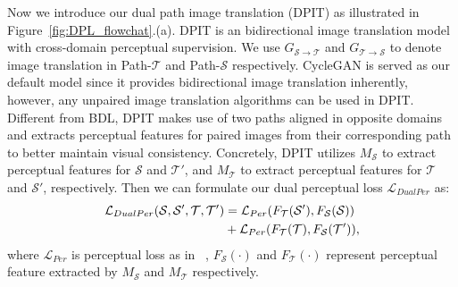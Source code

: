 \documentclass[10pt,twocolumn,letterpaper]{article}
\begin{document}
Now we introduce our dual path image translation (DPIT) as illustrated in Figure~\ref{fig:DPL_flowchat}.(a). DPIT is an bidirectional image translation model with cross-domain perceptual supervision. We use ${G_{\mathcal{S}\rightarrow\mathcal{T}}}$ and ${G_{\mathcal{T}\rightarrow\mathcal{S}}}$ to denote image translation in Path-$\mathcal{T}$ and Path-$\mathcal{S}$ respectively. CycleGAN is served as our default model since it provides bidirectional image translation inherently, however, any unpaired image translation algorithms can be used in DPIT. Different from BDL, DPIT makes use of two paths aligned in opposite domains and extracts perceptual features for paired images from their corresponding path to better maintain visual consistency. Concretely, DPIT utilizes $M_{\mathcal{S}}$ to extract perceptual features for $\mathcal{S}$ and $\mathcal{T}'$, and $M_{\mathcal{T}}$ to extract perceptual features for $\mathcal{T}$ and $\mathcal{S}'$, respectively. Then we can formulate our dual perceptual loss $\mathcal{L}_{DualPer}$ as:
\begin{equation}
  \label{loss:tranlation_loss}
  \begin{aligned}
 \mathcal{L}_{DualPer}(\mathcal{S}, \mathcal{S}', \mathcal{T}, \mathcal{T}')&=  \mathcal{L}_{Per}(F_{\mathcal{T}}(\mathcal{S}'), F_{\mathcal{S}}(\mathcal{S}))\\
 &+\mathcal{L}_{Per}(F_{\mathcal{T}}(\mathcal{T}), F_{\mathcal{S}}(\mathcal{T}')),
  \end{aligned}
  \vspace{-0.1cm}
 \end{equation}
 where $\mathcal{L}_{Per}$ is perceptual loss as in ~\cite{li2019bidirectional}, $F_{\mathcal{S}}(\cdot)$ and $F_{\mathcal{T}}(\cdot)$ represent perceptual feature extracted by $M_{\mathcal{S}}$ and $M_{\mathcal{T}}$ respectively. 
\end{document}
